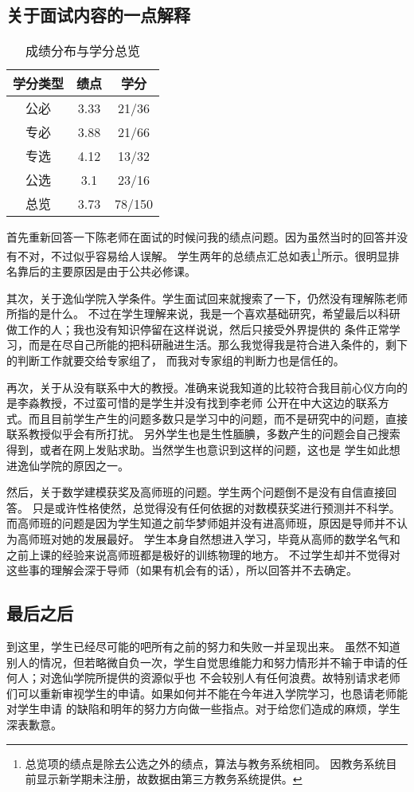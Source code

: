 \documentclass[10pt,a4paper]{article}
\begin{document}
\begin{spacing}{1.6}
\subsection{关于面试内容的一点解释}
\begin{table}[h]
\centering
\caption{成绩分布与学分总览}
\begin{tabular}{c c c}
\hline
学分类型 & 绩点 & 学分\\ [.2ex]
\hline \hline
公必 & 3.33	&21/36  \\
专必 & 3.88	&21/66 \\
专选 & 4.12 &13/32 \\
公选 & 3.1	&23/16 \\
总览 & 3.73	&78/150 \\ [.2ex]
\hline
\end{tabular}
\label{t:gr}
\end{table}
首先重新回答一下陈老师在面试的时候问我的绩点问题。因为虽然当时的回答并没有不对，不过似乎容易给人误解。
学生两年的总绩点汇总如表\ref{t:gr}\footnote{总览项的绩点是除去公选之外的绩点，算法与教务系统相同。
因教务系统目前显示新学期未注册，故数据由第三方教务系统提供。}所示。很明显排名靠后的主要原因是由于公共必修课。\par
其次，关于逸仙学院入学条件。学生面试回来就搜索了一下，仍然没有理解陈老师所指的是什么。
不过在学生理解来说，我是一个喜欢基础研究，希望最后以科研做工作的人；我也没有知识停留在这样说说，然后只接受外界提供的
条件正常学习，而是在尽自己所能的把科研融进生活。那么我觉得我是符合进入条件的，剩下的判断工作就要交给专家组了，
而我对专家组的判断力也是信任的。\par
再次，关于从没有联系中大的教授。准确来说我知道的比较符合我目前心仪方向的是李淼教授，不过蛮可惜的是学生并没有找到李老师
公开在中大这边的联系方式。而且目前学生产生的问题多数只是学习中的问题，而不是研究中的问题，直接联系教授似乎会有所打扰。
另外学生也是生性腼腆，多数产生的问题会自己搜索得到，或者在网\cite{phyfor}上发贴求助。当然学生也意识到这样的问题，这也是
学生如此想进逸仙学院的原因之一。\par
然后，关于数学建模获奖及高师班的问题。学生两个问题倒不是没有自信直接回答。
只是或许性格使然，总觉得没有任何依据的对数模获奖进行预测并不科学。
而高师班的问题是因为学生知道之前华梦师姐并没有进高师班，原因是导师并不认为高师班对她的发展最好。
学生本身自然想进入学习，毕竟从高师的数学名气和之前上课的经验来说高师班都是极好的训练物理的地方。
不过学生却并不觉得对这些事的理解会深于导师（如果有机会有的话），所以回答并不去确定。\par
\subsection{最后之后}
到这里，学生已经尽可能的吧所有之前的努力和失败一并呈现出来。
虽然不知道别人的情况，但若略微自负一次，学生自觉思维能力和努力情形并不输于申请的任何人；对逸仙学院所提供的资源似乎也
不会较别人有任何浪费。故特别请求老师们可以重新审视学生的申请。如果如何并不能在今年进入学院学习，也恳请老师能对学生申请
的缺陷和明年的努力方向做一些指点。对于给您们造成的麻烦，学生深表歉意。

\end{spacing}

\medskip
\renewcommand\refname{提到的书籍和网页}


\end{document}
